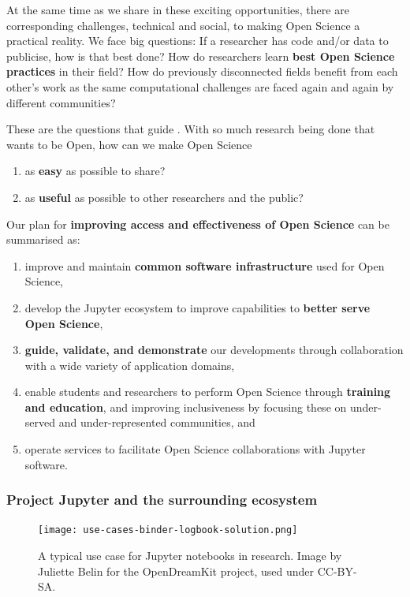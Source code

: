 At the same time as we share in these exciting opportunities, there
are corresponding challenges, technical and social, to making Open
Science a practical reality.  We face big questions: If a researcher
has code and/or data to publicise, how is that best done?  How do
researchers learn \textbf{best Open Science practices} in their field?  How do
previously disconnected fields benefit from each other's work as the
same computational challenges are faced again and again by different
communities?

These are the questions that guide \TheProject.
With so much research being done that wants to be Open,
how can we make Open Science

\begin{enumerate}
    \item as \textbf{easy} as possible to share?
    \item as \textbf{useful} as possible to other researchers and the public?
\end{enumerate}

\noindent Our plan for \textbf{improving access and effectiveness of Open Science} can be summarised as:

\begin{enumerate}
\item improve and maintain \textbf{common software infrastructure} used for
  Open Science,
\item develop the Jupyter ecosystem to improve capabilities to \textbf{better
  serve Open Science},
\item \textbf{guide, validate, and demonstrate} our developments through
  collaboration with a wide variety of application domains,
\item enable students and researchers to perform Open Science through
  \textbf{training and education}, and improving inclusiveness by focusing
  these on under-served and under-represented communities, and
\item operate services to facilitate Open Science collaborations with
  Jupyter software.
\end{enumerate}

\medskip

\subsubsection{Project Jupyter and the surrounding ecosystem}
\label{sec:project-jupyter}

\begin{figure}[htb]\centering
  \texttt{[image: use-cases-binder-logbook-solution.png]}
  \caption{A typical use case for Jupyter notebooks in research.
            Image by Juliette Belin for the OpenDreamKit project, used under
            CC-BY-SA.}\label{fig:use-cases-binder}
\end{figure}

